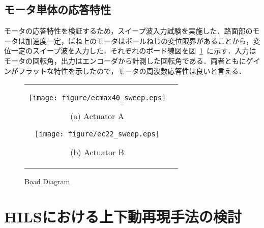 \documentclass{article_vdlab_sotsuron_youshi}
\begin{document}
\subsection{モータ単体の応答特性}
モータの応答特性を検証するため，スイープ波入力試験を実施した．路面部のモータは加速度一定，ばね上のモータはボールねじの変位限界があることから，変位一定のスイープ波を入力した．それぞれのボード線図を図~\ref{fig:sweep}~に示す．入力はモータの回転角，出力はエンコーダから計測した回転角である．両者ともにゲインがフラットな特性を示したので，モータの周波数応答性は良いと言える．

\vspace*{-2mm}
\begin{figure}[H]
  \begin{tabular}{cc}
  \begin{minipage}{0.5\hsize}
  \begin{center} 
    \texttt{[image: figure/ecmax40\_sweep.eps]}
  \end{center}
  \vspace*{-13mm}
  \begin{center}
    \ (a) Actuator A\
  \end{center}
  \end{minipage}
  \hspace*{-4mm}
  \begin{minipage}{0.45\hsize}
    \begin{center}
      \texttt{[image: figure/ec22\_sweep.eps]}
    \end{center}
    \vspace*{-13mm}
    \begin{center}
      \ (b) Actuator B\
    \end{center}
  \end{minipage}
  \end{tabular}
    \vspace*{1mm}
    \caption{Boad Diagram}
    \label{fig:sweep}
\end{figure}

\vspace*{-2mm}
\section{HILSにおける上下動再現手法の検討}
\end{document}
